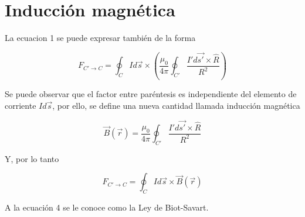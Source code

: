 \section{Inducción magnética}
La ecuacion 1 se puede expresar también de la forma

\begin{equation}
    F_{C' \rightarrow C}=\oint_C  Id\vec{s}\times  \left(\frac{\mu_0}{4\pi} \oint_{C'} \frac{I'd\vec{s'} \times \hat{R}}{R^2} \right)
\end{equation}

Se puede observar que el factor entre paréntesis es independiente del elemento de corriente $Id\vec{s}$, por ello, se define una nueva cantidad llamada inducción magnética 

\begin{equation}
    \vec{B}(\vec{r})= \frac{\mu_0}{4\pi} \oint_{C'} \frac{I'd\vec{s'} \times \hat{R}}{R^2}
\end{equation}

Y, por lo tanto

\begin{equation}
    F_{C' \rightarrow C}=\oint_C  Id\vec{s}\times  \vec{B}(\vec{r})
\end{equation}

A la ecuación 4 se le conoce como la Ley de Biot-Savart.


